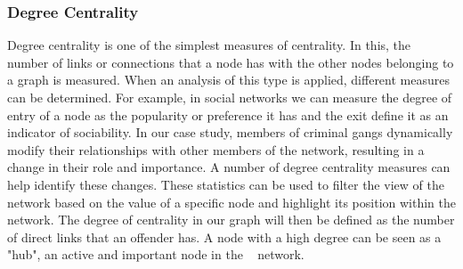 \subsubsection{Degree Centrality} 
Degree centrality is one of the simplest measures of centrality. In this, the number of links or connections that a node has with the other nodes belonging to a graph is measured. When an analysis of this type is applied, different measures can be determined. For example, in social networks we can measure the degree of entry of a node as the popularity or preference it has and the exit define it as an indicator of sociability. In our case study, members of criminal gangs dynamically modify their relationships with other members of the network, resulting in a change in their role and importance. A number of degree centrality measures can help identify these changes. These statistics can be used to filter the view of the network based on the value of a specific node and highlight its position within the network. The degree of centrality in our graph will then be defined as the number of direct links that an offender has. A node with a high degree can be seen as a "hub", an active and important node in the ~\cite{carley2006destabilization} network.
\vspace{-10pt}
